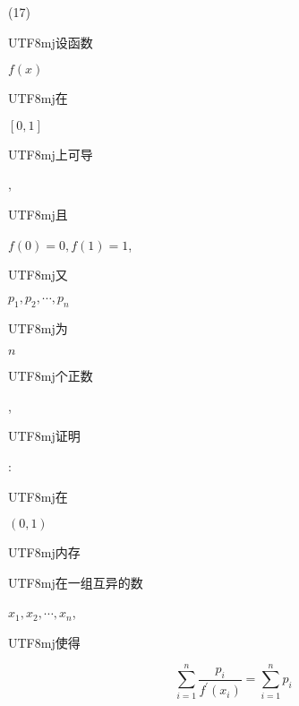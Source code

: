 \documentclass[10pt]{article}
\begin{document}
(17) \begin{CJK}{UTF8}{mj}设函数\end{CJK} $f(x)$ \begin{CJK}{UTF8}{mj}在\end{CJK} $[0,1]$ \begin{CJK}{UTF8}{mj}上可导\end{CJK}, \begin{CJK}{UTF8}{mj}且\end{CJK} $f(0)=0, f(1)=1$, \begin{CJK}{UTF8}{mj}又\end{CJK} $p_{1}, p_{2}, \cdots, p_{n}$ \begin{CJK}{UTF8}{mj}为\end{CJK} $n$ \begin{CJK}{UTF8}{mj}个正数\end{CJK}, \begin{CJK}{UTF8}{mj}证明\end{CJK}: \begin{CJK}{UTF8}{mj}在\end{CJK} $(0,1)$ \begin{CJK}{UTF8}{mj}内存\end{CJK} \begin{CJK}{UTF8}{mj}在一组互异的数\end{CJK} $x_{1}, x_{2}, \cdots, x_{n}$, \begin{CJK}{UTF8}{mj}使得\end{CJK}
$$
\sum_{i=1}^{n} \frac{p_{i}}{f^{\prime}\left(x_{i}\right)}=\sum_{i=1}^{n} p_{i}
$$
\end{document}

